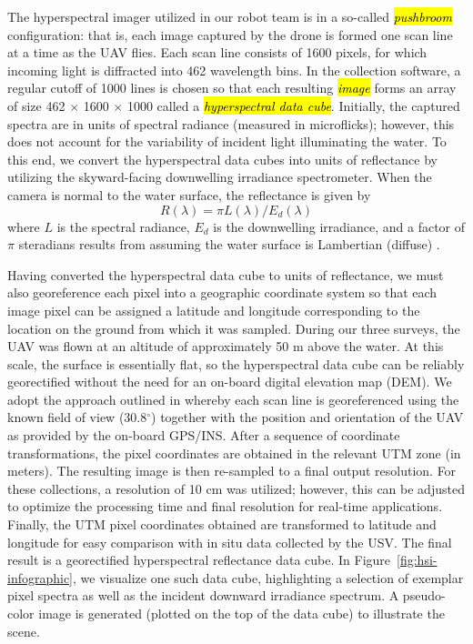 \documentclass[remotesensing,article,accept,pdftex,moreauthors]{Definitions/mdpi}
\begin{document}
The hyperspectral imager utilized in our robot team is in a so-called \textit{\hl{pushbroom}} configuration: that is, each image captured by the drone is formed one scan line at a time as the UAV flies. Each scan line consists of 1600 pixels, for which incoming light is diffracted into 462 wavelength bins. In the collection software, a regular cutoff of 1000 lines is chosen so that each resulting \hl{\textit{image}} forms an array of size 462 $\times$ 1600 $\times$ 1000 called a \textit{\hl{hyperspectral data cube}}. Initially, the captured spectra are in units of spectral radiance (measured in microflicks); however, this does not account for the variability of incident light illuminating the water. To this end, we convert the hyperspectral data cubes into units of reflectance by utilizing the skyward-facing downwelling irradiance spectrometer. When the camera is normal to the water surface, the reflectance is given by
\begin{equation}
    R(\lambda) = \pi L(\lambda)/E_d(\lambda)
\end{equation}
where $L$ is the spectral radiance, $E_d$ is the downwelling irradiance, and a factor of $\pi$ steradians results from assuming the water surface is Lambertian (diffuse) \cite{reflectance-conversion}. 

Having converted the hyperspectral data cube to units of reflectance, we must also georeference each pixel into a geographic coordinate system so that each image pixel can be assigned a latitude and longitude corresponding to the location on the ground from which it was sampled. During our three surveys, the UAV was flown at an altitude of approximately %
50 m above the water. At this scale, the surface is essentially flat, so the hyperspectral data cube can be reliably georectified without the need for an on-board digital elevation map (DEM). We adopt the approach outlined in \cite{GeorectificationMuller, GeorectificationBaumker, GeorectificationMostafa} whereby each scan line is georeferenced using the known field of view (30.8$^\circ$) together with the position and orientation of the UAV as provided by the on-board GPS/INS. After a sequence of coordinate transformations, the pixel coordinates are obtained in the relevant UTM zone (in meters). The resulting image is then re-sampled to a final output resolution. For these collections, a resolution of 10 cm was utilized; however, this can be adjusted to optimize the processing time and final resolution for real-time applications. Finally, the UTM pixel coordinates obtained are transformed to latitude and longitude for easy comparison with in situ data collected by the USV. The final result is a georectified hyperspectral reflectance data cube. In Figure~\ref{fig:hsi-infographic}, we visualize one such data cube, highlighting a selection of exemplar pixel spectra as well as the incident downward irradiance spectrum. A pseudo-color image is generated (plotted on the top of the data cube) to illustrate the scene.
\end{document}
